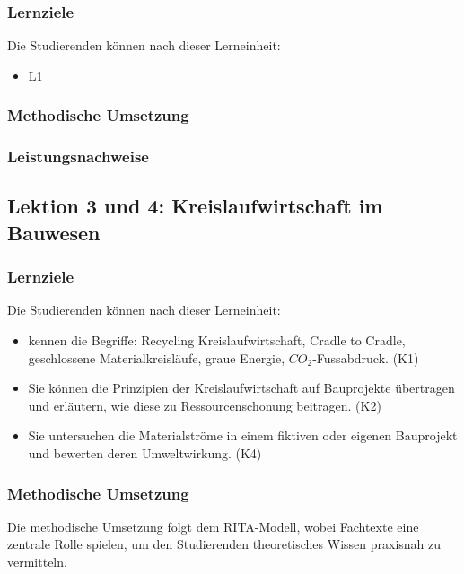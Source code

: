 \documentclass[
11pt,
captions=tableheading,
smallheadings,
headsepline,
footsepline, 
captions=tableheading,
parskip=half-,
]{scrartcl}
\begin{document}
\subsubsection{Lernziele}

Die Studierenden können nach dieser Lerneinheit:
\begin{itemize}
    \item L1
\end{itemize}
\subsubsection{Methodische Umsetzung}

\subsubsection{Leistungsnachweise}





\subsection{Lektion 3 und 4: Kreislaufwirtschaft im Bauwesen}
\subsubsection{Lernziele}
Die Studierenden können nach dieser Lerneinheit:
\begin{itemize}
    \item kennen die Begriffe: Recycling Kreislaufwirtschaft, Cradle to Cradle, geschlossene Materialkreisläufe, graue Energie, $CO_2$-Fussabdruck. (K1)
    \item Sie können die Prinzipien der Kreislaufwirtschaft auf Bauprojekte übertragen und erläutern, wie diese zu Ressourcenschonung beitragen. (K2)
    \item 	Sie untersuchen die Materialströme in einem fiktiven oder eigenen Bauprojekt und bewerten deren Umweltwirkung. (K4)
\end{itemize}
\subsubsection{Methodische Umsetzung}
Die methodische Umsetzung folgt dem RITA-Modell, wobei Fachtexte eine zentrale Rolle spielen, um den Studierenden theoretisches Wissen praxisnah zu vermitteln.
\end{document}
